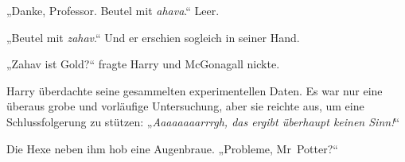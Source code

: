 „Danke, Professor. Beutel mit \emph{ahava}.“ Leer.

„Beutel mit \emph{zahav}.“ Und er erschien sogleich in seiner Hand.

„Zahav ist Gold?“ fragte Harry und McGonagall nickte.



Harry überdachte seine gesammelten experimentellen Daten. Es war nur eine überaus grobe und vorläufige Untersuchung, aber sie reichte aus, um eine Schlussfolgerung zu stützen:
„\emph{Aaaaaaaarrrgh, das ergibt überhaupt keinen Sinn!}“

Die Hexe neben ihm hob eine Augenbraue.
„Probleme, Mr~Potter?“

